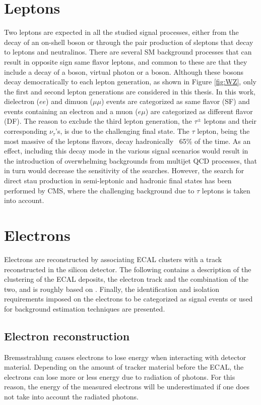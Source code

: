 \section{Leptons}
Two leptons are expected in all the studied signal processes, either from the decay of an on-shell \PZ boson or through the pair production of sleptons that decay to leptons and neutralinos. 
There are several SM background processes that can result in opposite sign same flavor leptons, and common to these are that they include a decay of a \PZ boson, virtual photon or a \PW boson. 
Although these bosons decay democratically to each lepton generation, as shown in Figure \ref{fig:WZ}, only the first and second lepton generations are considered in this thesis. 
In this work, dielectron ($ee$) and dimuon ($\mu\mu$) events are categorized as same flavor (SF) and events containing an electron and a muon ($e\mu$) are categorized as different flavor (DF). 
The reason to exclude the third lepton generation, the $\tau^{\pm}$ leptons and their corresponding $\nu_{\tau}$'s, is due to the challenging final state. 
The $\tau$ lepton, being the most massive of the leptons flavors, decay hadronically ~65\% of the time. 
As an effect, including this decay mode in the various signal scenarios would result in the introduction of overwhelming backgrounds from multijet QCD processes, that in turn would decrease the sensitivity of the searches. 
However, the search for direct stau production in semi-leptonic and hadronic final states has been performed by CMS\cite{CMS-PAS-SUS-17-002,Sirunyan:2018vig}, where the challenging background due to $\tau$ leptons is taken into account.  
\section{Electrons}
\label{subsub:electrons}
Electrons are reconstructed by associating ECAL clusters with a track reconstructed in the silicon detector. 
The following contains a description of the clustering of the ECAL deposits, the electron track and the combination of the two, and is roughly based on \cite{Khachatryan:2015hwa}. 
Finally, the identification and isolation requirements imposed on the electrons to be categorized as signal events or used for background estimation techniques are presented. 
\subsection{Electron reconstruction}
Bremsstrahlung causes electrons to lose energy when interacting with detector material. 
Depending on the amount of tracker material before the ECAL, the electrons can lose more or less energy due to radiation of photons. 
For this reason, the energy of the measured electrons will be underestimated if one does not take into account the radiated photons. 
